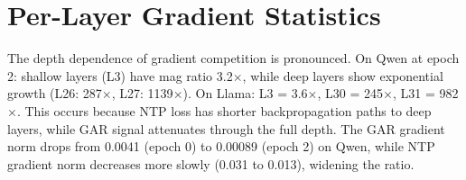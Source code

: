 \documentclass[11pt]{article}
\begin{document}
\section{Per-Layer Gradient Statistics}
\label{sec:appendix-gradient}

The depth dependence of gradient competition is pronounced. On Qwen at epoch 2: shallow layers (L3) have mag ratio 3.2$\times$, while deep layers show exponential growth (L26: 287$\times$, L27: 1139$\times$). On Llama: L3 = 3.6$\times$, L30 = 245$\times$, L31 = 982$\times$. This occurs because NTP loss has shorter backpropagation paths to deep layers, while GAR signal attenuates through the full depth. The GAR gradient norm drops from 0.0041 (epoch 0) to 0.00089 (epoch 2) on Qwen, while NTP gradient norm decreases more slowly (0.031 to 0.013), widening the ratio.
\end{document}

